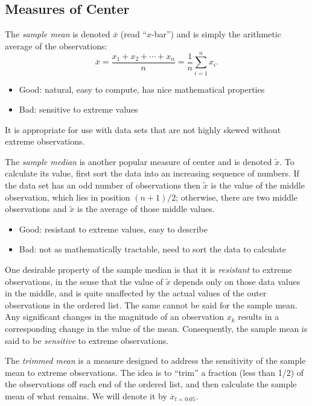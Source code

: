 \documentclass[10pt,english]{scrbook}
\begin{document}
\subsection[Measures of Center]{Measures of Center}
\label{sec-1-3-2}

The \emph{sample mean} is denoted \(\overline{x}\) (read ``\(x\)-bar'') and is simply the arithmetic average of the observations:
\begin{equation} 
\overline{x}=\frac{x_{1}+x_{2}+\cdots+x_{n}}{n}=\frac{1}{n}\sum_{i=1}^{n}x_{i}.
\end{equation}
\begin{itemize}
\item Good: natural, easy to compute, has nice mathematical properties
\item Bad: sensitive to extreme values
\end{itemize}

It is appropriate for use with data sets that are not highly skewed without extreme observations.

The \emph{sample median} is another popular measure of center and is denoted \(\tilde{x}\). To calculate its value, first sort the data into an increasing sequence of numbers. If the data set has an odd number of observations then \(\tilde{x}\) is the value of the middle observation, which lies in position \((n+1)/2\); otherwise, there are two middle observations and \(\tilde{x}\) is the average of those middle values.

\begin{itemize}
\item Good: resistant to extreme values, easy to describe
\item Bad: not as mathematically tractable, need to sort the data to calculate
\end{itemize}

One desirable property of the sample median is that it is \emph{resistant} to extreme observations, in the sense that the value of \(\tilde{x}\) depends only on those data values in the middle, and is quite unaffected by the actual values of the outer observations in the ordered list. The same cannot be said for the sample mean. Any significant changes in the magnitude of an observation \(x_{k}\) results in a corresponding change in the value of the mean. Consequently, the sample mean is said to be \emph{sensitive} to extreme observations.

The \emph{trimmed mean} is a measure designed to address the sensitivity of the sample mean to extreme observations. The idea is to ``trim'' a fraction (less than 1/2) of the observations off each end of the ordered list, and then calculate the sample mean of what remains. We will denote it by \(\overline{x}_{t=0.05}\).
\end{document}
